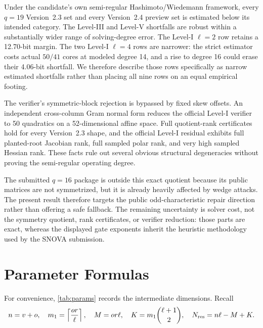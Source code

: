 \documentclass[runningheads]{llncs}
\newcommand{\SNOVA}{\textsf{SNOVA}}
\begin{document}
Under the candidate's own semi-regular Hashimoto/Wiedemann framework, every
$q=19$ Version~2.3 set and every Version~2.4 preview set is estimated below its
intended category.  The Level-III and Level-V shortfalls are robust within a
substantially wider range of solving-degree error.  The Level-I $\ell=2$ row
retains a 12.70-bit margin.  The two Level-I $\ell=4$ rows are narrower: the
strict estimator costs actual $50/41$ cores at modeled degree 14, and a rise to
degree 16 could erase their 4.06-bit shortfall.  We therefore describe those rows
specifically as narrow estimated shortfalls rather than placing all nine rows on
an equal empirical footing.

The verifier's symmetric-block rejection is bypassed by fixed skew offsets.  An
independent cross-column Gram normal form reduces the official Level-I verifier
to 50 quadratics on a 52-dimensional affine space.  Full quotient-rank
certificates hold for every Version~2.3 shape, and the official Level-I residual
exhibits full planted-root Jacobian rank, full sampled polar rank, and very high
sampled Hessian rank.  These facts rule out several obvious structural
degeneracies without proving the semi-regular operating degree.

The submitted $q=16$ package is outside this exact quotient because its public
matrices are not symmetrized, but it is already heavily affected by wedge attacks.
The present result therefore targets the public odd-characteristic repair
direction rather than offering a safe fallback.  The remaining uncertainty is
solver cost, not the symmetry quotient, rank certificates, or verifier reduction:
those parts are exact, whereas the displayed gate exponents inherit the heuristic
methodology used by the \SNOVA{} submission.

\appendix
\setcounter{section}{0}
\renewcommand{\thesection}{\Alph{section}}
\renewcommand{\theHsection}{app.\Alph{section}}

\section{Parameter Formulas}\label{app:parameters}

For convenience, \cref{tab:params} records the intermediate dimensions.  Recall
\[
 n=v+o,
 \quad m_1=\left\lceil\frac{or}{\ell}\right\rceil,
 \quad M=or\ell,
 \quad K=m_1\binom{\ell+1}{2},
 \quad N_{\rm res}=n\ell-M+K.
\]
\end{document}
